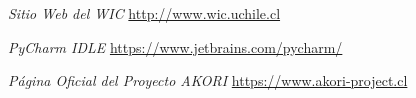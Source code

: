 \newpage %
\begin{references}
	\textit{Sitio Web del WIC}
	\url{http://www.wic.uchile.cl}
	
	\textit{PyCharm IDLE}
	\url{https://www.jetbrains.com/pycharm/}
	
	\textit{Página Oficial del Proyecto AKORI} 
	\url{https://www.akori-project.cl}
\end{references}

